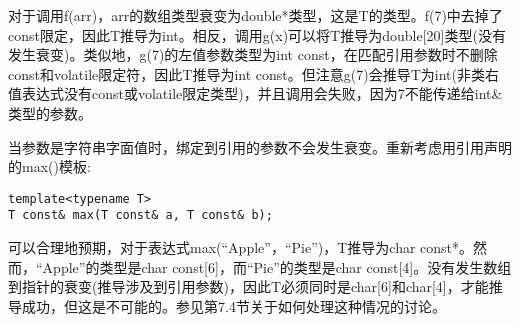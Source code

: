 对于调用f(arr)，arr的数组类型衰变为double*类型，这是T的类型。f(7)中去掉了const限定，因此T推导为int。相反，调用g(x)可以将T推导为double[20]类型(没有发生衰变)。类似地，g(7)的左值参数类型为int const，在匹配引用参数时不删除const和volatile限定符，因此T推导为int const。但注意g(7)会推导T为int(非类右值表达式没有const或volatile限定类型)，并且调用会失败，因为7不能传递给int\&类型的参数。

当参数是字符串字面值时，绑定到引用的参数不会发生衰变。重新考虑用引用声明的max()模板:

\begin{lstlisting}[style=styleCXX]
template<typename T>
T const& max(T const& a, T const& b);
\end{lstlisting} 

可以合理地预期，对于表达式max(“Apple”，“Pie”)，T推导为char const*。然而，“Apple”的类型是char const[6]，而“Pie”的类型是char const[4]。没有发生数组到指针的衰变(推导涉及到引用参数)，因此T必须同时是char[6]和char[4]，才能推导成功，但这是不可能的。参见第7.4节关于如何处理这种情况的讨论。























 